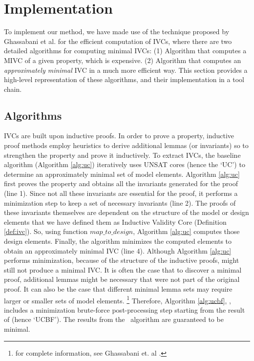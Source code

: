 \section{Implementation}
\label{sec:impl}

To implement our method, we have made use of the technique proposed by Ghassabani et al. \cite{Ghass16} for the efficient computation of IVCs, where there are two detailed algorithms for computing minimal IVCs: (1) Algorithm \ucbfalg that computes a MIVC of a given property, which is expensive. (2) Algorithm \ucalg that computes an \emph{approximately minimal} IVC in a much more efficient way. This section provides a high-level representation of these algorithms, and their implementation in a tool chain.

\subsection{Algorithms}
IVCs are built upon inductive proofs. In order to prove a property, inductive proof methods employ heuristics to derive additional lemmas (or invariants) so to strengthen the property and prove it inductively. To extract IVCs, the baseline algorithm \ucalg (Algorithm \ref{alg:uc}) iteratively uses UNSAT cores (hence the `UC') to determine an approximately minimal set of model elements.
Algorithm \ref{alg:uc}
first proves the property and obtains all the invariants generated for the proof (line 1). Since not all these invariants are essential for the proof, it performs a minimization step to keep a set of necessary invariants (line 2). The proofs of these invariants themselves are dependent on the structure of the model or design elements that we have defined them as Inductive Validity Core (Definition \ref{def:ivc}).
So, using function $map\_to\_design$, Algorithm \ref{alg:uc}
computes those design elements. Finally, the algorithm minimizes the computed elements to obtain an approximately minimal IVC (line 4).
Although Algorithm \ref{alg:uc} performs minimization, because of the structure of the inductive proofs, \ucalg might still not produce a minimal IVC. It is often the case that to discover a minimal proof, additional lemmas might be necessary that were not part of the original proof.  It can also be the case that different minimal lemma sets may require larger or smaller sets of model elements.
\footnote{for complete information, see Ghassabani et. al \cite{Ghass16}.}
Therefore, Algorithm \ref{alg:ucbf}, \ucbfalg, includes a minimization brute-force post-processing step starting from the result of \ucalg (hence `UCBF').  The results from the \ucbfalg\ algorithm are guaranteed to be minimal.

